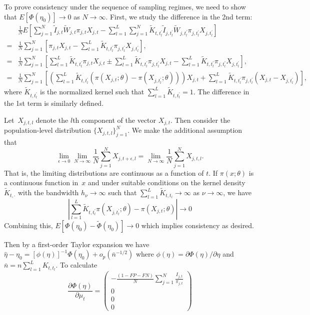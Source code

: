 \documentclass[11pt]{amsart}
\numberwithin{equation}{section}
\theoremstyle{plain}
\begin{document}
To prove consistency under the sequence of sampling regimes, we need to show that $E[ \Phi (\eta_0) ] \to 0$ as $N \to \infty$.  First, we study the difference in the 2nd term:
\begin{align*}
&\frac{1}{N}  E \left[ \sum_{j = 1}^N \tilde I_{j,t} \tilde W_{j,t}  \pi_{j,t} X_{j,t} - \sum_{l=1}^L  \sum_{j = 1}^N \tilde K_{t,t^\prime_l} \tilde I_{j,t^\prime_l} \tilde W_{j,t^\prime_l}  \pi_{j,t^\prime_l} X_{j,t^\prime_l} \right] \\
= &\frac{1}{N} \sum_{j = 1}^N \left[ \pi_{j,t} X_{j,t} - \sum_{l=1}^L \tilde K_{t,t^\prime_l} \pi_{j,t^\prime_l} X_{j,t^\prime_l} \right], \\
= &\frac{1}{N} \sum_{j = 1}^N \left[ \sum_{l=1}^L \tilde K_{t,t^\prime_l} \pi_{j,t} X_{j,t} \pm \sum_{l=1}^L \tilde K_{t,t^\prime_l} \pi_{j,t_l^\prime} X_{j,t}  - \sum_{l=1}^L \tilde K_{t,t^\prime_l} \pi_{j,t^\prime_l} X_{j,t^\prime_l} \right], \\
= &\frac{1}{N} \sum_{j = 1}^N \left[ \left( \sum_{l=1}^L \tilde K_{t,t^\prime_l}  \left( \pi (X_{j,t}; \theta) - \pi (X_{j,t^\prime_l}; \theta) \right) \right) X_{j,t} + \sum_{l=1}^L \tilde K_{t,t^\prime_l} \pi_{j,t^\prime_l} (X_{j,t} - X_{j,t^\prime_l} ) \right],
\end{align*}
where $\tilde K_{t, t^\prime_l}$ is the normalized kernel such that $\sum_{l=1}^L \tilde K_{t, t^\prime_l} = 1$. The difference in the 1st term is similarly defined.

Let~$X_{j,t,l}$ denote the $l$th component of the vector $X_{j,t}$.  Then consider the population-level distribution $\{ X_{j,t,l} \}_{j=1}^N$.  We make the additional assumption that
$$
\lim_{\epsilon \to 0} \lim_{N \to \infty} \frac{1}{N} \sum_{j=1}^N X_{j,t+\epsilon, l}  = \lim_{N \to \infty} \frac{1}{N} \sum_{j=1}^N X_{j,t, l}.
$$
That is, the limiting distributions are continuous as a function of $t$. If $\pi(x; \theta)$ is a continuous function in~$x$ and under suitable conditions on the kernel density~$\tilde K_{t, \cdot}$ with the bandwidth $h_\nu \to \infty$ such that $\sum_{l=1}^L \tilde K_{t,t_l} \to \infty$ as $\nu \to \infty$, we have
$$
\left | \sum_{l=1}^L \tilde K_{t, t_l^\prime} \pi (X_{j, t_l^\prime}; \theta) - \pi (X_{j, t}; \theta) \right|  \to 0
$$
Combining this, $E \left[ \Phi(\eta_0)  - \tilde \Phi (\eta_0) \right] \to 0$ which implies consistency as desired.

Then by a first-order Taylor expansion we have $\hat \eta - \eta_0 = \left[ \phi (\eta) \right]^{-1} \Phi(\eta_0) + o_p (\bar n^{-1/2})$ where $\phi(\eta) = \partial \Phi (\eta)/\partial \eta$ and $\bar n = n \sum_{l=1}^L K_{t,t_l}$.  To calculate
$$
\frac{\partial \Phi (\eta)}{\partial \mu_t} =
\left (
\begin{array}{c}
-\frac{(1-FP-FN)}{N} \sum_{j=1}^N \frac{I_{j,t}}{\pi_{j,t}} \\
0 \\
0 \\
0
\end{array}
\right )
$$
\end{document}
